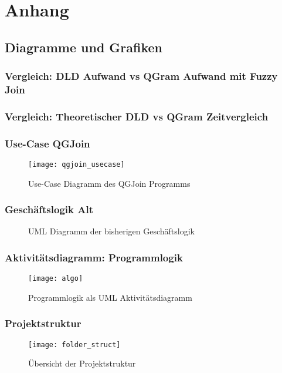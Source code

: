 \section{Anhang}
\subsection{Diagramme und Grafiken}
\subsubsection{Vergleich: DLD Aufwand vs QGram Aufwand mit Fuzzy Join}
\subsubsection{Vergleich: Theoretischer DLD vs QGram Zeitvergleich }
\subsubsection{Use-Case QGJoin}
\begin{figure}
	\caption{Use-Case Diagramm des QGJoin Programms}
	\label{fig:qgjoinUseCase}
	\texttt{[image: qgjoin\_usecase]}
\end{figure}

\subsubsection{Geschäftslogik Alt}
\begin{figure}
	\caption{UML Diagramm der bisherigen Geschäftslogik}
	\label{fig:geschäftslogikAlt}
\end{figure}



\subsubsection{Aktivitätsdiagramm: Programmlogik}
\begin{figure}[!htp]
	\caption{Programmlogik als UML Aktivitätsdiagramm}
	\label{fig:programmlogik}
	\texttt{[image: algo]}
	\centering
\end{figure}

\subsubsection{Projektstruktur}
\begin{figure}[!htp]
	\caption{Übersicht der Projektstruktur}
	\label{fig:folderstruct}
	\texttt{[image: folder\_struct]}
\end{figure}

